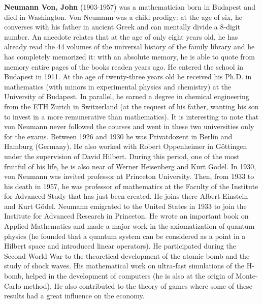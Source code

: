 \textbf{Neumann Von, John} (1903-1957) was a mathematician born in Budapest and died in Washington. Von Neumann was a child prodigy: at the age of six, he converses with his father in ancient Greek and can mentally divide a 8-digit number. An anecdote relates that at the age of only eight years old, he has already read the 44 volumes of the universal history of the family library and he has completely memorized it: with an absolute memory, he is able to quote from memory entire pages of the books readen years ago. He entered the school in Budapest in 1911. At the age of twenty-three years old he received his Ph.D. in mathematics (with minors in experimental physics and chemistry) at the University of Budapest. In parallel, he earned a degree in chemical engineering from the ETH Zurich in Switzerland (at the request of his father, wanting his son to invest in a more remunerative than mathematics). It is interesting to note that von Neumann never followed the courses and went in these two universities only for the exams. Between 1926 and 1930 he was Privatdozent in Berlin and Hamburg (Germany). He also worked with Robert Oppenheimer in Göttingen under the supervision of David Hilbert. During this period, one of the most fruitful of his life, he is also near of Werner Heisenberg and Kurt Gödel. In 1930, von Neumann was invited professor at Princeton University. Then, from 1933 to his death in 1957, he was professor of mathematics at the Faculty of the Institute for Advanced Study that has just been created. He joins there Albert Einstein and Kurt Gödel. Neumann emigrated to the United States in 1933 to join the Institute for Advanced Research in Princeton. He wrote an important book on Applied Mathematics and made a major work in the axiomatization of quantum physics (he founded that a quantum system can be considered as a point in a Hilbert space and introduced linear operators). He participated during the Second World War to the theoretical development of the atomic bomb and the study of shock waves. His mathematical work on ultra-fast simulations of the H-bomb, helped in the development of computers (he is also at the origin of Monte-Carlo method). He also contributed to the theory of games where some of these results had a great influence on the economy.

